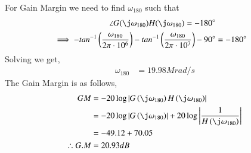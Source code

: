 \begin{enumerate}[label=\thesection.\arabic*.,ref=\thesection.\theenumi]
For Gain Margin we need to find $\omega_{180}$ such that 
\begin{align}
\angle G(\j\omega_{180})H(\j\omega_{180})= -180\degree \\
\implies -tan^{-1}\brak{\frac{\omega_{180}}{2\pi\cdot10^{6}}}-tan^{-1}\brak{\frac{\omega_{180}}{2\pi\cdot10^{7}}}-90\degree &=-180\degree
\end{align}
Solving we get,
\begin{align}
\omega_{180}&=19.98M rad/s
\end{align}
The Gain Margin is as follows,
\begin{align}
GM &= -20\log\abs{G\brak{\j\omega_{180}}H\brak{\j\omega_{180}}} \\
&= -20\log\abs{G\brak{\j\omega_{180}}}+20\log\abs{\frac{1}{H\brak{\j\omega_{180}}}} \\
&= -49.12+70.05 \\
\therefore G.M &= 20.93 dB
\end{align}




\end{enumerate}
